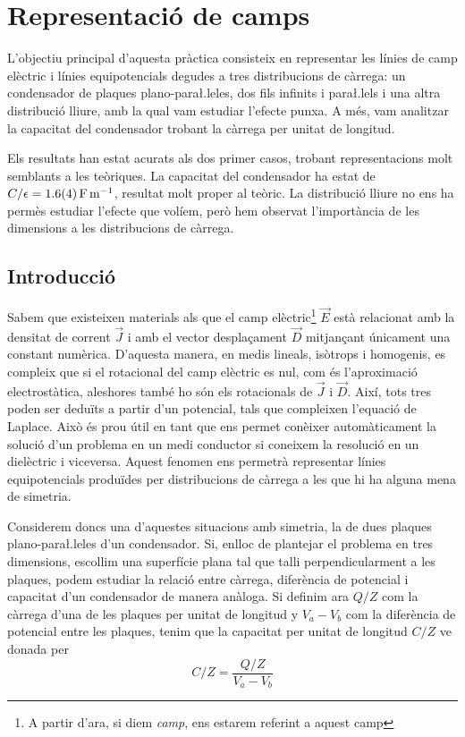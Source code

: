 \chapter{Representació de camps}
\begin{resum}
	L'objectiu principal d'aquesta pràctica consisteix en representar les línies de camp elèctric i línies equipotencials degudes a tres distribucions de càrrega: un condensador de plaques plano-para\l.leles, dos fils infinits i para\l.lels i una altra distribució lliure, amb la qual vam estudiar l'efecte punxa. A més, vam analitzar la capacitat del condensador trobant la càrrega per unitat de longitud.

	Els resultats han estat acurats als dos primer casos, trobant representacions molt semblants a les teòriques. La capacitat del condensador ha estat de $C/\epsilon = \data{1.6}{0.4}{F.m^{-1}} $, resultat molt proper al teòric. La distribució lliure no ens ha permès estudiar l'efecte que volíem, però hem observat l'importància de les dimensions a les distribucions de càrrega.
\end{resum}

\section{Introducció}
Sabem que existeixen materials als que el camp elèctric\footnote{A partir d'ara, si diem \textit{camp}, ens estarem referint a aquest camp} $\vec{E}$ està relacionat amb la densitat de corrent $\vec{J}$ i amb el vector desplaçament $\vec{D}$ mitjançant únicament una constant numèrica. D'aquesta manera, en medis lineals, isòtrops i homogenis, es compleix que si el rotacional del camp elèctric es nul, com és l'aproximació electrostàtica, aleshores també ho són els rotacionals de $\vec{J}$ i $\vec{D}$. Així, tots tres poden ser deduïts a partir d'un potencial, tals que compleixen l'equació de Laplace. Això és prou útil en tant que ens permet conèixer automàticament la solució d'un problema en un medi conductor si coneixem la resolució en un dielèctric i viceversa. Aquest fenomen ens permetrà representar línies equipotencials produïdes per distribucions de càrrega a les que hi ha alguna mena de simetria.

Considerem doncs una d'aquestes situacions amb simetria, la de dues plaques plano-para\l.leles d'un condensador. Si, enlloc de plantejar el problema en tres dimensions, escollim una superfície plana tal que talli perpendicularment a les plaques, podem estudiar la relació entre càrrega, diferència de potencial i capacitat d'un condensador de manera anàloga. Si definim ara $Q/Z$ com la càrrega d'una de les plaques per unitat de longitud y $V_a-V_b$ com la diferència de potencial entre les plaques, tenim que la capacitat per unitat de longitud $C/Z$ ve donada per
\begin{equation} \label{eq:capacitat}
	C/Z=\frac{Q/Z}{V_a-V_b}
\end{equation}

